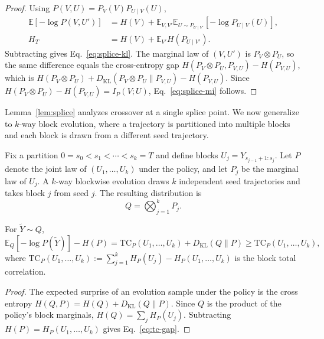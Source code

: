 \documentclass{llmxive}
\begin{document}
\begin{proof}
Using $P(V,U)=P_V(V)P_{U\mid V}(U)$,
\begin{align}
  \mathbb{E}[-\log P(V,U')]
  &=H(V)+\mathbb{E}_{V,V'}\mathbb{E}_{U\sim P_{U\mid V'}}[-\log P_{U\mid V}(U)],\\
  H_T
  &=H(V)+\mathbb{E}_{V'}H(P_{U\mid V'}).
\end{align}
Subtracting gives Eq.~\eqref{eq:splice-kl}. The marginal law of $(V,U')$ is $P_V\otimes P_U$, so the same difference equals the cross-entropy gap $H(P_V\otimes P_U,P_{V,U})-H(P_{V,U})$, which is
$H(P_V\otimes P_U)+D_{\mathrm{KL}}(P_V\otimes P_U\|P_{V,U})-H(P_{V,U})$.
Since $H(P_V\otimes P_U)-H(P_{V,U})=I_P(V;U)$, Eq.~\eqref{eq:splice-mi} follows.
\end{proof}

Lemma~\ref{lem:splice} analyzes crossover at a single splice point. We now generalize to $k$-way block evolution, where a trajectory is partitioned into multiple blocks and each block is drawn from a different seed trajectory.

Fix a partition $0=s_0<s_1<\cdots<s_k=T$ and define blocks $U_j=Y_{s_{j-1}+1:s_j}$. Let $P$ denote the joint law of $(U_1,\ldots,U_k)$ under the policy, and let $P_j$ be the marginal law of $U_j$. A $k$-way blockwise evolution draws $k$ independent seed trajectories and takes block $j$ from seed $j$. The resulting distribution is
\begin{equation}
  Q=\bigotimes_{j=1}^{k}P_j.
  \label{eq:product-law}
\end{equation}

\begin{lemma}
\label{lem:tc}
For $\widetilde{Y}\sim Q$,
\begin{equation}
  \mathbb{E}_{Q}[-\log P(\widetilde{Y})]-H(P)
  =\mathrm{TC}_P(U_1,\ldots,U_k)+D_{\mathrm{KL}}(Q\|P)
  \ge\mathrm{TC}_P(U_1,\ldots,U_k),
  \label{eq:tc-gap}
\end{equation}
where $\mathrm{TC}_P(U_1,\ldots,U_k) := \sum_{j=1}^{k}H_P(U_j)-H_P(U_1,\ldots,U_k)$ is the block total correlation.
\end{lemma}

\begin{proof}
The expected surprise of an evolution sample under the policy is the cross entropy $H(Q,P)=H(Q)+D_{\mathrm{KL}}(Q\|P)$. Since $Q$ is the product of the policy's block marginals, $H(Q)=\sum_j H_P(U_j)$. Subtracting $H(P)=H_P(U_1,\ldots,U_k)$ gives Eq.~\eqref{eq:tc-gap}.
\end{proof}
\end{document}
